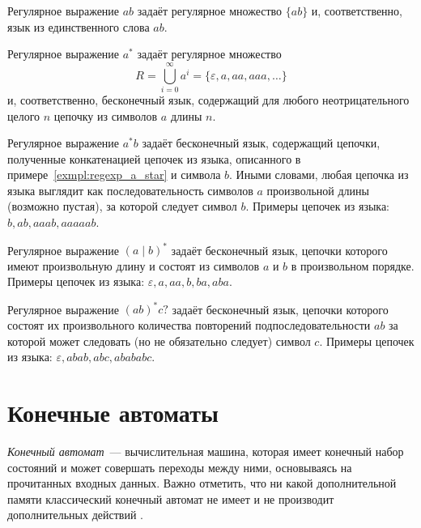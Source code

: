 \begin{example}
    Регулярное выражение $ab$ задаёт регулярное множество $\{ab\}$ и, соответственно, язык из единственного слова $ab$.
\end{example}


\begin{example}\label{exmpl:regexp_a_star}
    Регулярное выражение $a^*$ задаёт регулярное множество $$R = \bigcup_{i=0}^{\infty}{a^i} = \{\varepsilon, a, aa, aaa, \ldots \}$$ и, соответственно, бесконечный язык, содержащий для любого неотрицательного целого $n$ цепочку из символов $a$ длины $n$.
\end{example}

\begin{example}
    Регулярное выражение $a^*b$ задаёт бесконечный язык, содержащий цепочки, полученные конкатенацией цепочек из языка, описанного в примере~\ref{exmpl:regexp_a_star} и символа $b$.
    Иными словами, любая цепочка из языка выглядит как последовательность символов $a$ произвольной длины (возможно пустая), за которой следует символ $b$.
    Примеры цепочек из языка: $b, ab, aaab, aaaaab$.
\end{example}

\begin{example}
    Регулярное выражение $(a\mid b)^*$ задаёт бесконечный язык, цепочки которого имеют произвольную длину и состоят из символов $a$ и $b$ в произвольном порядке.
    Примеры цепочек из языка: $\varepsilon, a, aa, b, ba, aba$.
\end{example}

\begin{example}
    Регулярное выражение $(ab)^*c?$ задаёт бесконечный язык, цепочки которого состоят их произвольного количества повторений подпоследовательности $ab$ за которой может следовать (но не обязательно следует) символ $c$.
    Примеры цепочек из языка: $\varepsilon, abab, abc, abababc$.
\end{example}

\section{Конечные автоматы}

\emph{Конечный автомат}~--- вычислительная машина, которая имеет конечный набор состояний и может совершать переходы между ними, основываясь на прочитанных входных данных.
Важно отметить, что ни какой дополнительной памяти классический конечный автомат не имеет%
 и не производит дополнительных действий%
.

